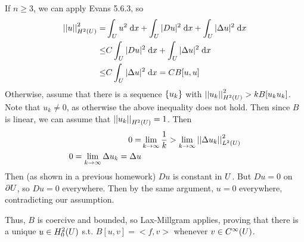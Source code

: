 \begin{enumerate}
  If $n \geq 3$, we can apply Evans 5.6.3, so
  \begin{align*}
    \left|\left|u\right|\right|_{H^{2}(U)}^2 = &\int_{U} u^2 \;\mathrm{d}x + \int_{U} |D u|^2 \;\mathrm{d}x + \int_{U} |\Delta u|^2 \;\mathrm{d}x\\
                   \leq & C \int_{U} |D u|^2 \;\mathrm{d}x + \int_{U} |\Delta u|^2 \;\mathrm{d}x\\
                   \leq & C \int_{U} |\Delta u|^2 \;\mathrm{d}x = C B[u, u]
  \end{align*}
  Otherwise, assume that there is a sequence $\{ u_k \}$ with $\left|\left|u_k\right|\right|_{H^{2}(U)}^2 > k B[u_k u_k]$.
  Note that $u_k \neq 0$, as otherwise the above inequality does not hold.
  Then since $B$ is linear, we can assume that $\left|\left|u_k\right|\right|_{H^{2}(U)} = 1$.
  Then
  \begin{align*}
    0 = &\lim \limits_{k \rightarrow \infty} \frac{1}{k} > \lim \limits_{k \rightarrow \infty} \left|\left|\Delta u_k\right|\right|_{L^{2}(U)}^2\\
    0 = \lim \limits_{k \rightarrow \infty} \Delta u_k = \Delta u
  \end{align*}
  Then (as shown in a previous homework) $D u$ is constant in $U$.
  But $D u = 0$ on $\partial U$, so $D u = 0$ everywhere.
  Then by the same argument, $u = 0$ everywhere, contradicting our assumption.

  Thus, $B$ is coercive and bounded, so Lax-Millgram applies,
  proving that there is a unique $u \in H_0^2(U)$ s.t. $B[u, v] = <f, v>$
  whenever $v \in C^\infty(U)$.
\end{enumerate}
